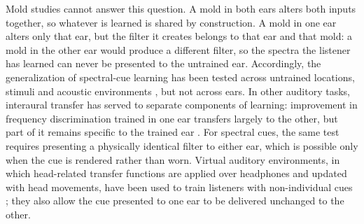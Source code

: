 Mold studies cannot answer this question. A mold in both ears alters both
inputs together, so whatever is learned is shared by construction. A mold in
one ear alters only that ear, but the filter it creates belongs to that ear and
that mold: a mold in the other ear would produce a different filter, so the
spectra the listener has learned can never be presented to the untrained ear.
Accordingly, the generalization of spectral-cue learning has been tested across
untrained locations, stimuli and acoustic environments
\citep{carlile_relearning_2014, watson_generalization_2017}, but not across
ears. In other auditory tasks, interaural transfer has served to separate
components of learning: improvement in frequency discrimination trained in one
ear transfers largely to the other, but part of it remains specific to the
trained ear \citep{delhommeau_transfer_2002}. For spectral cues, the same test
requires presenting a physically identical filter to either ear, which is
possible only when the cue is rendered rather than worn. Virtual auditory
environments, in which head-related transfer functions are applied over
headphones and updated with head movements, have been used to train listeners
with non-individual cues \citep{parseihian_rapid_2012}; they also allow the cue
presented to one ear to be delivered unchanged to the other.

